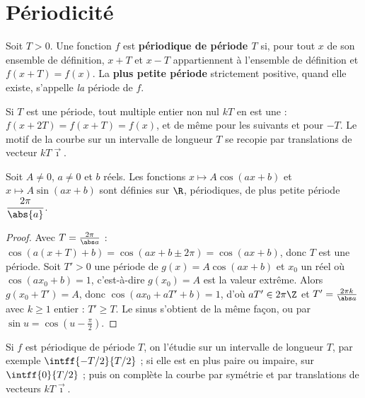 \section{Périodicité}
\begin{definition}
Soit $T>0$. Une fonction $f$ est \textbf{périodique de période $T$} si, pour tout $x$ de son ensemble de définition, $x+T$ et $x-T$ appartiennent à l'ensemble de définition et $f(x+T)=f(x)$. La \textbf{plus petite période} strictement positive, quand elle existe, s'appelle \emph{la} période de $f$.
\end{definition}
Si $T$ est une période, tout multiple entier non nul $kT$ en est une : $f(x+2T)=f(x+T)=f(x)$, et de même pour les suivants et pour $-T$. Le motif de la courbe sur un intervalle de longueur $T$ se recopie par translations de vecteur $kT\vec\imath$.
\begin{figurebox}[Courbe de $f(x)=2\cos(2x)$ : le motif sur $\intff{0}{\pi}$ se recopie, la période est $\pi$.]
\end{figurebox}
\begin{theorem}
Soit $A\ne0$, $a\ne0$ et $b$ réels. Les fonctions $x\mapsto A\cos(ax+b)$ et $x\mapsto A\sin(ax+b)$ sont définies sur $\R$, périodiques, de plus petite période $\dfrac{2\pi}{\abs{a}}$.
\end{theorem}
\begin{proof}
Avec $T=\frac{2\pi}{\abs a}$ : $\cos(a(x+T)+b)=\cos(ax+b\pm2\pi)=\cos(ax+b)$, donc $T$ est une période. Soit $T'>0$ une période de $g(x)=A\cos(ax+b)$ et $x_0$ un réel où $\cos(ax_0+b)=1$, c'est-à-dire $g(x_0)=A$ est la valeur extrême. Alors $g(x_0+T')=A$, donc $\cos(ax_0+aT'+b)=1$, d'où $aT'\in2\pi\Z$ et $T'=\frac{2\pi k}{\abs a}$ avec $k\ge1$ entier : $T'\ge T$. Le sinus s'obtient de la même façon, ou par $\sin u=\cos(u-\frac\pi2)$.
\end{proof}
\begin{method}
Si $f$ est périodique de période $T$, on l'étudie sur un intervalle de longueur $T$, par exemple $\intff{-T/2}{T/2}$ ; si elle est en plus paire ou impaire, sur $\intff{0}{T/2}$ ; puis on complète la courbe par symétrie et par translations de vecteurs $kT\vec\imath$.
\end{method}
